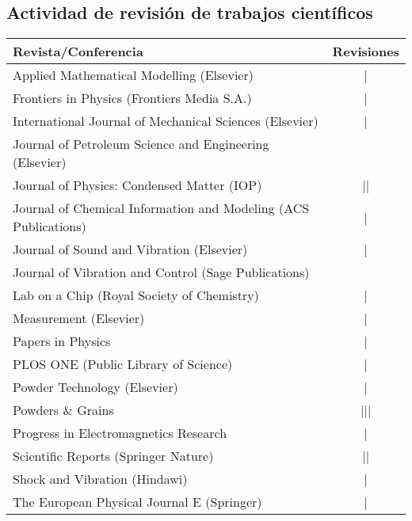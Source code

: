 \subsection{Actividad de revisión de trabajos científicos}
\begin{tabular}{l c}
    \toprule
    \textbf{Revista/Conferencia} & R\textbf{evisiones} \\
    \midrule
    Applied Mathematical Modelling (Elsevier) & | \\ 
    Frontiers in Physics (Frontiers Media S.A.) & | \\
    International Journal of Mechanical Sciences (Elsevier) & | \\
    Journal of Petroleum Science and Engineering (Elsevier) & \cancel{||||} \\
    Journal of Physics: Condensed Matter (IOP) & || \\
    Journal of Chemical Information and Modeling (ACS Publications) & | \\
    Journal of Sound and Vibration (Elsevier) & \cancel{||||} | \\
    Journal of Vibration and Control (Sage Publications) & \cancel{||||} \\
    Lab on a Chip (Royal Society of Chemistry) & | \\
    Measurement (Elsevier) &  | \\
    Papers in Physics & | \\
    PLOS ONE (Public Library of Science) & | \\
    Powder Technology (Elsevier) & | \\
    Powders \& Grains & ||| \\
    Progress in Electromagnetics Research & | \\
    Scientific Reports (Springer Nature) & || \\
    Shock and Vibration (Hindawi) &  | \\
    The European Physical Journal E (Springer) & | \\
    \bottomrule
\end{tabular}

